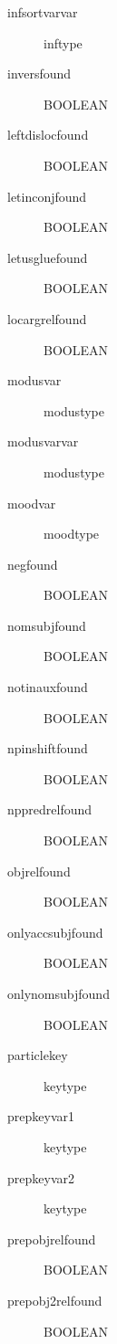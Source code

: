 \begin{description}
\item [infsortvarvar      ] inftype\\
\item [inversfound        ] BOOLEAN\\
\item [leftdislocfound    ] BOOLEAN\\
\item [letinconjfound     ] BOOLEAN\\
\item [letusgluefound     ] BOOLEAN\\
\item [locargrelfound     ]  BOOLEAN\\
\item [modusvar           ] modustype\\
\item [modusvarvar        ] modustype\\
\item [moodvar            ] moodtype\\
\item [negfound           ] BOOLEAN\\
\item [nomsubjfound       ] BOOLEAN\\
\item [notinauxfound      ] BOOLEAN\\
\item [npinshiftfound     ] BOOLEAN\\
\item [nppredrelfound     ]  BOOLEAN\\
\item [objrelfound        ] BOOLEAN\\
\item [onlyaccsubjfound   ] BOOLEAN \\
\item [onlynomsubjfound   ] BOOLEAN \\
\item [particlekey        ] keytype\\
\item [prepkeyvar1        ] keytype\\
\item [prepkeyvar2        ] keytype\\
\item [prepobjrelfound    ] BOOLEAN\\
\item [prepobj2relfound   ] BOOLEAN\\

\end{description}

